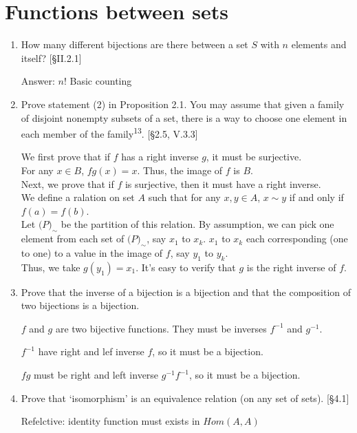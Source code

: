 \section{Functions between sets}
\begin{enumerate}
    \item How many different bijections are there between a set $S$ with $n$ elements and itself? [\S II.2.1]
    \begin{solution}
        Answer: $n!$
        Basic counting
    \end{solution}
    \item Prove statement (2) in Proposition 2.1. You may assume that given a family of disjoint nonempty subsets of a set, there is a way to choose one element in each member of the family\textsuperscript{13}. [\S2.5, V.3.3]
    \begin{solution}
        We first prove that if $f$ has a right inverse $g$, it must be surjective. 
        \\
        For any $x \in B$, $fg(x)=x$. Thus, the image of $f$ is $B$.
        \\
        Next, we prove that if $f$ is surjective, then it must have a right inverse. 
        \\
        We define a ralation on set $A$ such that for any $x,y \in A$, $x\sim y$ if and only if $f(a)=f(b)$. 
        \\
        Let $\mathcal(P)_{\sim}$ be the partition of this relation. By assumption, we can pick one element from each set of $\mathcal(P)_{\sim}$, say $x_1$ to $x_k$. 
        $x_1$ to $x_k$ each corresponding (one to one) to a value in the image of $f$, say $y_1$ to $y_k$.
        \\Thus, we take $g(y_1)=x_1$. 
        It's easy to verify that $g$ is the right inverse of $f$. 
    \end{solution}
    \item Prove that the inverse of a bijection is a bijection and that the composition of two bijections is a bijection.
        \begin{solution}
            $f$ and $g$ are two bijective functions. They must be inverses $f^{-1}$ and $g^{-1}$. 
   
            
            $f^{-1}$ have right and lef inverse $f$, so it must be a bijection. 
      
            
            $fg$ must be right and left inverse $g^{-1}f^{-1}$, so it must be a bijection. 
        \end{solution}
    \item Prove that `isomorphism' is an equivalence relation (on any set of sets). [\S4.1]
        \begin{solution}
            Refelctive: identity function must exists in $Hom(A,A)$
      

\end{solution}
\end{enumerate}
